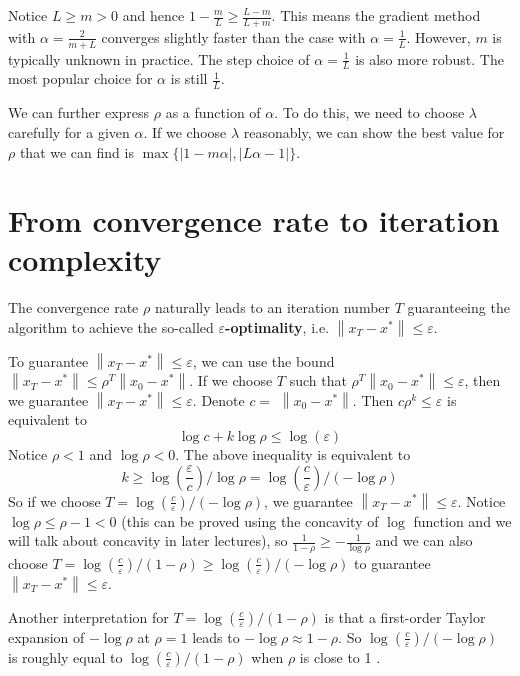 \documentclass[11pt]{elegantbook}
\begin{document}
Notice $L \geq m>0$ and hence $1-\frac{m}{L} \geq \frac{L-m}{L+m}$. This means the gradient method with $\alpha=\frac{2}{m+L}$ converges slightly faster than the case with $\alpha=\frac{1}{L}$. However, $m$ is typically unknown in practice. The step choice of $\alpha=\frac{1}{L}$ is also more robust. The most popular choice for $\alpha$ is still $\frac{1}{L}$.

We can further express $\rho$ as a function of $\alpha$. To do this, we need to choose $\lambda$ carefully for a given $\alpha$. If we choose $\lambda$ reasonably, we can show the best value for $\rho$ that we can find is $\max \{|1-m \alpha|,|L \alpha-1|\}$.


\section{From convergence rate to iteration complexity}
The convergence rate $\rho$ naturally leads to an iteration number $T$ guaranteeing the algorithm to achieve the so-called \textbf{$\varepsilon$-optimality}, i.e. $\left\|x_{T}-x^{*}\right\| \leq \varepsilon$.

To guarantee $\left\|x_{T}-x^{*}\right\| \leq \varepsilon$, we can use the bound $\left\|x_{T}-x^{*}\right\| \leq \rho^{T}\left\|x_{0}-x^{*}\right\| .$ If we choose $T$ such that $\rho^{T}\left\|x_{0}-x^{*}\right\| \leq \varepsilon$, then we guarantee $\left\|x_{T}-x^{*}\right\| \leq \varepsilon .$ Denote $c=$ $\left\|x_{0}-x^{*}\right\| .$ Then $c \rho^{k} \leq \varepsilon$ is equivalent to
$$
\log c+k \log \rho \leq \log (\varepsilon)
$$
Notice $\rho<1$ and $\log \rho<0$. The above inequality is equivalent to
$$
k \geq \log \left(\frac{\varepsilon}{c}\right) / \log \rho=\log \left(\frac{c}{\varepsilon}\right) /(-\log \rho)
$$
So if we choose $T=\log \left(\frac{c}{\varepsilon}\right) /(-\log \rho)$, we guarantee $\left\|x_{T}-x^{*}\right\| \leq \varepsilon$.
Notice $\log \rho \leq \rho-1<0$ (this can be proved using the concavity of $\log$ function and we will talk about concavity in later lectures), so $\frac{1}{1-\rho} \geq-\frac{1}{\log \rho}$ and we can also choose $T=\log \left(\frac{c}{\varepsilon}\right) /(1-\rho) \geq \log \left(\frac{c}{\varepsilon}\right) /(-\log \rho)$ to guarantee $\left\|x_{T}-x^{*}\right\| \leq \varepsilon$.

Another interpretation for $T=\log \left(\frac{c}{\varepsilon}\right) /(1-\rho)$ is that a first-order Taylor expansion of $-\log \rho$ at $\rho=1$ leads to $-\log \rho \approx 1-\rho$. So $\log \left(\frac{c}{\varepsilon}\right) /(-\log \rho)$ is roughly equal to $\log \left(\frac{c}{\varepsilon}\right) /(1-\rho)$ when $\rho$ is close to 1 .
\end{document}
